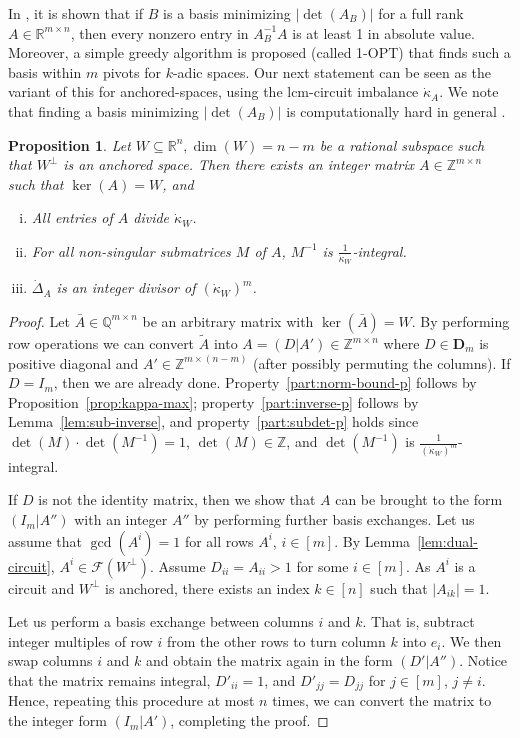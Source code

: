 \documentclass[11pt, a4paper]{article}
\newcommand{\1}{\mathbbm{1}}
\newcommand{\kd}{{\dot{\kappa}}}
\newcommand{\Q}{\mathbb{Q}}
\newcommand{\EE}{\mathcal F}
\newcommand{\bD}{\mathbf{D}}
\newtheorem{prop}[theorem]{Proposition}
\theoremstyle{case}
\newcommand{\R}{\mathbb{R}}
\newcommand{\Z}{\mathbb{Z}}
\begin{document}
In \cite[Section 7]{Lee89}, it is shown that if $B$ is a basis minimizing $|\det(A_B)|$ for a full rank $A\in \R^{m\times n}$, then every nonzero entry in $A_B^{-1} A$ is at least 1 in absolute value. Moreover, a simple greedy algorithm is proposed (called \textsc{1-OPT}) that finds such a basis within $m$ pivots for $k$-adic spaces. Our next statement can be seen as the variant of this for anchored-spaces, using the lcm-circuit imbalance $\kd_A$.
We note that finding a basis minimizing $|\det(A_B)|$ is computationally hard in general \cite{khachiyan1995}.

\begin{prop} \label{prop:B_inverse}
  Let $W \subseteq \R^n, \dim(W) = n - m$ be a rational subspace such that $W^\perp$ is an  anchored space. Then there exists an integer matrix $A\in \Z^{m\times n}$ such that $\ker(A) = W$, and
  \begin{enumerate}[(i)]
    \item\label{part:norm-bound-p} All entries of $A$ divide $\kd_W$.
    \item\label{part:inverse-p} For all non-singular submatrices $M$ of $A$, $M^{-1}$ is $\frac{1}{\kd_W}$-integral.
    \item\label{part:subdet-p} $\dot\Delta_A$ is an integer divisor of $(\kd_W)^m$.
  \end{enumerate}
\end{prop}
\begin{proof}
  Let $\bar A \in \Q^{m\times n}$ be an arbitrary matrix with $\ker(\bar A) = W$. By performing row operations we can convert $\tilde A$ into $A = (D | A') \in \Z^{m \times n}$ where $D \in \bD_m$ is positive diagonal and $A' \in \Z^{m \times (n-m)}$ (after possibly permuting the columns). If $D=I_m$, then we are already done. Property~\ref{part:norm-bound-p} follows by Proposition~\ref{prop:kappa-max}; property~\ref{part:inverse-p}
 follows by Lemma~\ref{lem:sub-inverse}, and property~\ref{part:subdet-p} holds since $\det(M)\cdot\det(M^{-1})=1$, $\det(M)\in\Z$, and $\det(M^{-1})$ is $\frac{1}{(\kd_W)^m}$-integral.

  If $D$ is not the identity matrix, then we show that $A$ can be brought to the form $(I_m | A'')$ with an integer $A''$ by performing further basis exchanges. 
  Let  us assume that $\gcd(A^i) = 1$ for all rows $A^i$, $i \in [m]$.
By Lemma~\ref{lem:dual-circuit}, $A^i\in \EE(W^\perp)$.
Assume $D_{ii}=A_{ii}> 1$ for some $i\in [m]$.
  As $A^i$ is a circuit and $W^\perp$ is anchored, there exists an index $k \in [n]$ such that $|A_{ik}| = 1$.

Let us perform a basis exchange between columns $i$ and $k$. That is, 
subtract integer multiples of row $i$ from the other rows to turn column $k$ into $e_i$. We then swap columns $i$ and $k$ and obtain the matrix again in the form $(D'|A'')$. 
Notice that the matrix remains integral,  $D'_{ii}=1$, and $D'_{jj}=D_{jj}$ for $j\in [m]$, $j\neq i$. Hence, repeating this procedure at most $n$ times, we can convert the matrix to the integer form $(I_m|A')$, completing the proof.
\end{proof}
\end{document}

